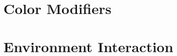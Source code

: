 \section{Color Modifiers}

\label{app::color-editing}




\section{Environment Interaction}

\label{app::env-interactions}



